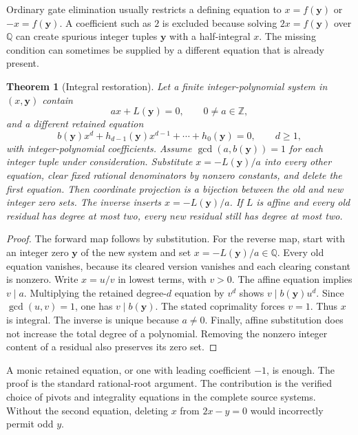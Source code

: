 \documentclass[11pt]{article}
\newtheorem{theorem}{Theorem}[section]
\theoremstyle{remark}\newtheorem{remark}[theorem]{Remark}
\newcommand{\Z}{\mathbb Z}
\newcommand{\Q}{\mathbb Q}
\begin{document}
Ordinary gate elimination usually restricts a defining equation to
$x=f(\boldsymbol y)$ or $-x=f(\boldsymbol y)$. A coefficient such as $2$
is excluded because solving $2x=f(\boldsymbol y)$ over $\Q$ can create
spurious integer tuples $\boldsymbol y$ with a half-integral $x$.
The missing condition can sometimes be supplied by a different equation
that is already present.

\begin{theorem}[Integral restoration]\label{thm:projection}
Let a finite integer-polynomial system in $(x,\boldsymbol y)$ contain
\[
a x+L(\boldsymbol y)=0,\qquad 0\ne a\in\Z,
\]
and a different retained equation
\[
b(\boldsymbol y)x^d+
h_{d-1}(\boldsymbol y)x^{d-1}+\cdots+h_0(\boldsymbol y)=0,
\qquad d\ge1,
\]
with integer-polynomial coefficients. Assume
$\gcd(a,b(\boldsymbol y))=1$ for each integer tuple under consideration.
Substitute $x=-L(\boldsymbol y)/a$ into every other equation, clear fixed
rational denominators by nonzero constants, and delete the first equation.
Then coordinate projection is a bijection between the old and new
integer zero sets. The inverse inserts $x=-L(\boldsymbol y)/a$.
If $L$ is affine and every old residual has degree at most two, every new
residual still has degree at most two.
\end{theorem}

\begin{proof}
The forward map follows by substitution. For the reverse map, start with
an integer zero $\boldsymbol y$ of the new system and set
$x=-L(\boldsymbol y)/a\in\Q$. Every old equation vanishes, because its
cleared version vanishes and each clearing constant is nonzero.
Write $x=u/v$ in lowest terms, with $v>0$. The affine equation implies
$v\mid a$. Multiplying the retained degree-$d$ equation by $v^d$ shows
$v\mid b(\boldsymbol y)u^d$. Since $\gcd(u,v)=1$, one has
$v\mid b(\boldsymbol y)$. The stated coprimality forces $v=1$.
Thus $x$ is integral. The inverse is unique because $a\ne0$.
Finally, affine substitution does not increase the total degree of a
polynomial. Removing the nonzero integer content of a residual also
preserves its zero set.
\end{proof}

A monic retained equation, or one with leading coefficient $-1$, is
enough. The proof is the standard rational-root argument. The contribution
is the verified choice of pivots and integrality equations in the
complete source systems. Without the second equation, deleting $x$ from
$2x-y=0$ would incorrectly permit odd $y$.
\end{document}
